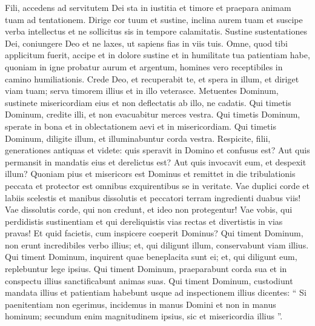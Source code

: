 \begin{biblechapter}
\begin{biblechapter}
\verse Fili, accedens ad servitutem Dei
 sta in iustitia et timore
 et praepara animam tuam ad tentationem.
 \verse Dirige cor tuum et sustine,
 inclina aurem tuam et suscipe verba intellectus
 et ne sollicitus sis in tempore calamitatis.
 \verse Sustine sustentationes Dei, coniungere Deo et ne laxes,
 ut sapiens fias in viis tuis.
 \verse Omne, quod tibi applicitum fuerit, accipe et in dolore sustine
 et in humilitate tua patientiam habe,
 \verse quoniam in igne probatur aurum et argentum,
 homines vero receptibiles in camino humiliationis.
 \verse Crede Deo, et recuperabit te,
 et spera in illum, et diriget viam tuam;
 serva timorem illius et in illo veterasce.
 \verse Metuentes Dominum, sustinete misericordiam eius
 et non deflectatis ab illo, ne cadatis.
 \verse Qui timetis Dominum, credite illi,
 et non evacuabitur merces vestra.
 \verse Qui timetis Dominum, sperate in bona
 et in oblectationem aevi et in misericordiam.
 \verse Qui timetis Dominum, diligite illum, et illuminabuntur corda vestra.
 \verse Respicite, filii, generationes antiquas et videte:
 quis speravit in Domino et confusus est?
 \verse Aut quis permansit in mandatis eius et derelictus est?
 Aut quis invocavit eum, et despexit illum?
 \verse Quoniam pius et misericors est Dominus
 et remittet in die tribulationis peccata
 et protector est omnibus exquirentibus se in veritate.
 \verse Vae duplici corde et labiis scelestis et manibus dissolutis
 et peccatori terram ingredienti duabus viis!
 \verse Vae dissolutis corde, qui non credunt,
 et ideo non protegentur!
 \verse Vae vobis, qui perdidistis sustinentiam
 et qui dereliquistis vias rectas et divertistis in vias pravas!
 \verse Et quid facietis, cum inspicere coeperit Dominus?
 \verse Qui timent Dominum, non erunt incredibiles verbo illius;
 et, qui diligunt illum, conservabunt viam illius.
 \verse Qui timent Dominum, inquirent quae beneplacita sunt ei;
 et, qui diligunt eum, replebuntur lege ipsius.
 \verse Qui timent Dominum, praeparabunt corda sua
 et in conspectu illius sanctificabunt animas suas.
 \verse Qui timent Dominum, custodiunt mandata illius
 et patientiam habebunt usque ad inspectionem illius
 \verse dicentes: “ Si paenitentiam non egerimus,
 incidemus in manus Domini et non in manus hominum;
 \verse secundum enim magnitudinem ipsius,
 sic et misericordia illius ”.
 

\end{biblechapter}
\end{biblechapter}
